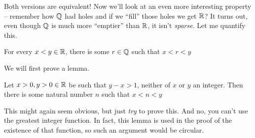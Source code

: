 Both versions are equivalent!
\newpage
Now we'll look at an even more interesting property -- remember how $\mathbb{Q}$ had holes and if we ``fill'' those holes we get $\mathbb{R}$? It turns out, even though $\mathbb{Q}$ is much more ``emptier'' than $\mathbb{R}$, it isn't \emph{sparse}. Let me quantify this.

\begin{SNP}{\thm}{For every $x < y \in \mathbb{R}$, there is some $r \in \mathbb{Q}$ such that $x < r < y$}
\end{SNP}

We will first prove a lemma.

\begin{SNP}{\lm}{Let $x > 0, y > 0 \in \mathbb{R}$ be such that $y - x > 1$, neither of $x$ or $y$ an integer. Then there is some natural number $n$ such that $x < n < y$}
\end{SNP}
This might again seem obvious, but just \emph{try} to prove this. And no, you can't use the greatest integer function. In fact, this lemma is used in the proof of the existence of that function, so such an argument would be circular.

